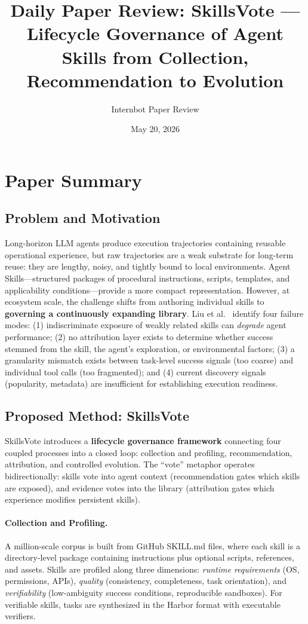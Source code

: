 \documentclass[11pt,a4paper]{article}
\title{Daily Paper Review: SkillsVote --- Lifecycle Governance of Agent Skills from Collection, Recommendation to Evolution}
\author{Internbot Paper Review}
\date{May 20, 2026}
\begin{document}
\maketitle

\section{Paper Summary}

\subsection{Problem and Motivation}

Long-horizon LLM agents produce execution trajectories containing reusable operational experience, but raw trajectories are a weak substrate for long-term reuse: they are lengthy, noisy, and tightly bound to local environments. Agent Skills---structured packages of procedural instructions, scripts, templates, and applicability conditions---provide a more compact representation. However, at ecosystem scale, the challenge shifts from authoring individual skills to \textbf{governing a continuously expanding library}. Liu et al.~\cite{skillsvote} identify four failure modes: (1) indiscriminate exposure of weakly related skills can \textit{degrade} agent performance; (2) no attribution layer exists to determine whether success stemmed from the skill, the agent's exploration, or environmental factors; (3) a granularity mismatch exists between task-level success signals (too coarse) and individual tool calls (too fragmented); and (4) current discovery signals (popularity, metadata) are insufficient for establishing execution readiness.

\subsection{Proposed Method: SkillsVote}

SkillsVote introduces a \textbf{lifecycle governance framework} connecting four coupled processes into a closed loop: collection and profiling, recommendation, attribution, and controlled evolution. The ``vote'' metaphor operates bidirectionally: skills vote into agent context (recommendation gates which skills are exposed), and evidence votes into the library (attribution gates which experience modifies persistent skills).

\paragraph{Collection and Profiling.}
A million-scale corpus is built from GitHub SKILL.md files, where each skill is a directory-level package containing instructions plus optional scripts, references, and assets. Skills are profiled along three dimensions: \textit{runtime requirements} (OS, permissions, APIs), \textit{quality} (consistency, completeness, task orientation), and \textit{verifiability} (low-ambiguity success conditions, reproducible sandboxes). For verifiable skills, tasks are synthesized in the Harbor format with executable verifiers.
\end{document}
